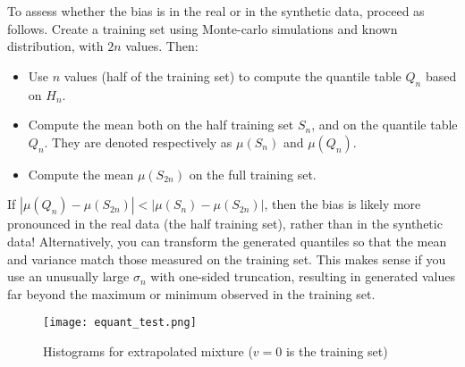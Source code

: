 \documentclass[oneside,10pt]{book}
\begin{document}
To assess whether the bias is in the real or in the synthetic data, proceed as follows. Create a training set using
 Monte-carlo simulations and known distribution, with $2n$ values. Then:\vspace{1ex}
\begin{itemize}
\item Use $n$ values (half of the training set) to compute the quantile table $Q_n$
 based on $H_n$.
\item Compute the mean both on the half training set $S_n$, and on the quantile table $Q_n$. They  are denoted respectively
 as $\mu(S_n)$ and $\mu(Q_n)$.
\item Compute the mean $\mu(S_{2n})$ on the full training set.
\end{itemize}
\vspace{1ex}
If $|\mu(Q_n) - \mu(S_{2n})| < |\mu(S_n) - \mu(S_{2n})|$, then the bias is likely more pronounced in the real data (the half training set), rather than in the synthetic data! Alternatively, you can transform the generated quantiles so that the mean and variance match those measured on the training set. This
 makes sense if you use an unusually large $\sigma_n$ with
 one-sided truncation, resulting in generated values far beyond the maximum or minimum observed in the training set.



\begin{figure}[H]
\centering
\texttt{[image: equant\_test.png]}
\caption{Histograms for extrapolated mixture ($v=0$ is the training set)}
\label{tssaqws09}
\end{figure}
\end{document}
